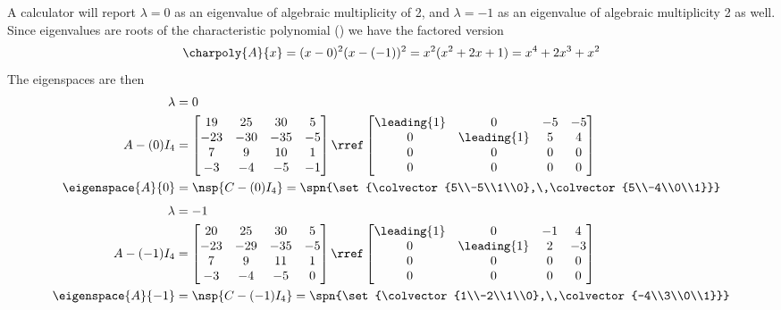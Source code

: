 A calculator will report $\lambda=0$ as an eigenvalue of algebraic multiplicity of 2, and $\lambda=-1$ as an eigenvalue of algebraic multiplicity 2 as well.  Since eigenvalues are roots of the characteristic polynomial () we have the factored version
%
\begin{equation*}
\charpoly{A}{x}=(x-0)^2(x-(-1))^2=x^2(x^2+2x+1)=x^4+2x^3+x^2
\end{equation*}
%
The eigenspaces are then
%
\begin{align*}
%
\lambda&=0\\
A-(0)I_4&=
\begin{bmatrix}
 19 & 25 & 30 & 5 \\
 -23 & -30 & -35 & -5 \\
 7 & 9 & 10 & 1 \\
 -3 & -4 & -5 & -1
\end{bmatrix}
\rref
\begin{bmatrix}
 \leading{1} & 0 & -5 & -5 \\
 0 & \leading{1} & 5 & 4 \\
 0 & 0 & 0 & 0 \\
 0 & 0 & 0 & 0
\end{bmatrix}\\
\eigenspace{A}{0}&=\nsp{C-(0)I_4}=
\spn{\set{\colvector{5\\-5\\1\\0},\,\colvector{5\\-4\\0\\1}}}
%
\end{align*}
%
%
\begin{align*}
%
\lambda&=-1\\
A-(-1)I_4&=
\begin{bmatrix}
 20 & 25 & 30 & 5 \\
 -23 & -29 & -35 & -5 \\
 7 & 9 & 11 & 1 \\
 -3 & -4 & -5 & 0
\end{bmatrix}
\rref
\begin{bmatrix}
 \leading{1} & 0 & -1 & 4 \\
 0 & \leading{1} & 2 & -3 \\
 0 & 0 & 0 & 0 \\
 0 & 0 & 0 & 0
\end{bmatrix}\\
\eigenspace{A}{-1}&=\nsp{C-(-1)I_4}=
\spn{\set{\colvector{1\\-2\\1\\0},\,\colvector{-4\\3\\0\\1}}}
%
\end{align*}
